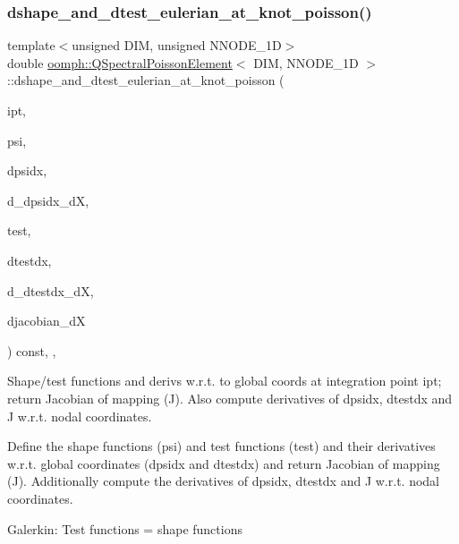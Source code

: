 \subsubsection{\texorpdfstring{dshape\+\_\+and\+\_\+dtest\+\_\+eulerian\+\_\+at\+\_\+knot\+\_\+poisson()}{dshape\_and\_dtest\_eulerian\_at\_knot\_poisson()}\hspace{0.1cm}{\footnotesize\ttfamily [2/2]}}
{\footnotesize\ttfamily template$<$unsigned D\+IM, unsigned N\+N\+O\+D\+E\+\_\+1D$>$ \\
double \hyperlink{classoomph_1_1QSpectralPoissonElement}{oomph\+::\+Q\+Spectral\+Poisson\+Element}$<$ D\+IM, N\+N\+O\+D\+E\+\_\+1D $>$\+::dshape\+\_\+and\+\_\+dtest\+\_\+eulerian\+\_\+at\+\_\+knot\+\_\+poisson (\begin{DoxyParamCaption}\item[{const unsigned \&}]{ipt,  }\item[{\hyperlink{classoomph_1_1Shape}{Shape} \&}]{psi,  }\item[{\hyperlink{classoomph_1_1DShape}{D\+Shape} \&}]{dpsidx,  }\item[{\hyperlink{classoomph_1_1RankFourTensor}{Rank\+Four\+Tensor}$<$ double $>$ \&}]{d\+\_\+dpsidx\+\_\+dX,  }\item[{\hyperlink{classoomph_1_1Shape}{Shape} \&}]{test,  }\item[{\hyperlink{classoomph_1_1DShape}{D\+Shape} \&}]{dtestdx,  }\item[{\hyperlink{classoomph_1_1RankFourTensor}{Rank\+Four\+Tensor}$<$ double $>$ \&}]{d\+\_\+dtestdx\+\_\+dX,  }\item[{\hyperlink{classoomph_1_1DenseMatrix}{Dense\+Matrix}$<$ double $>$ \&}]{djacobian\+\_\+dX }\end{DoxyParamCaption}) const\hspace{0.3cm}{\ttfamily [inline]}, {\ttfamily [protected]}, {\ttfamily [virtual]}}



Shape/test functions and derivs w.\+r.\+t. to global coords at integration point ipt; return Jacobian of mapping (J). Also compute derivatives of dpsidx, dtestdx and J w.\+r.\+t. nodal coordinates. 

Define the shape functions (psi) and test functions (test) and their derivatives w.\+r.\+t. global coordinates (dpsidx and dtestdx) and return Jacobian of mapping (J). Additionally compute the derivatives of dpsidx, dtestdx and J w.\+r.\+t. nodal coordinates.

Galerkin\+: Test functions = shape functions 

